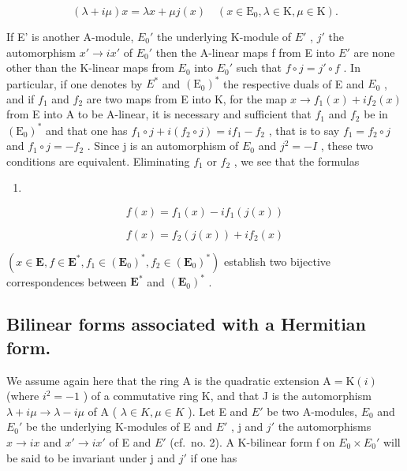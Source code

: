 \[
(\lambda + i \mu) x = \lambda x + \mu j (x) \quad (x \in \mathrm{E} _ {0}, \lambda \in \mathrm{K}, \mu \in \mathrm{K}).\tag{2}
\]

If E' is another A-module, \(E_{0}'\) the underlying K-module of \(E'\) , \(j'\) the automorphism \(x' \rightarrow ix'\) of \(E_{0}'\) then the A-linear maps f from E into \(E'\) are none other than the K-linear maps from \(E_{0}\) into \(E_{0}'\) such that \(f \circ j = j' \circ f\) . In particular, if one denotes by \(E^{*}\) and \((\mathrm{E}_{0})^{*}\) the respective duals of E and \(E_{0}\) , and if \(f_{1}\) and \(f_{2}\) are two maps from E into K, for the map \(x \to f_{1}(x) + if_{2}(x)\) from E into A to be A-linear, it is necessary and sufficient that \(f_{1}\) and \(f_{2}\) be in \((\mathrm{E}_{0})^{*}\) and that one has \(f_{1} \circ j + i(f_{2} \circ j) = if_{1} - f_{2}\) , that is to say \(f_{1} = f_{2} \circ j\) and \(f_{1} \circ j = -f_{2}\) . Since j is an automorphism of \(E_{0}\) and \(j^{2} = -I\) , these two conditions are equivalent. Eliminating \(f_{1}\) or \(f_{2}\) , we see that the formulas

\begin{enumerate}
\def\labelenumi{(\arabic{enumi})}
\setcounter{enumi}{2}
\tightlist
\item
\end{enumerate}

\[
f (x) = f _ {1} (x) - i f _ {1} (j (x))\tag{4}
\]

\[
f (x) = f _ {2} (j (x)) + i f _ {2} (x)
\]

\((x \in \mathbf{E}, f \in \mathbf{E}^{*}, f_{1} \in (\mathbf{E}_{0})^{*}, f_{2} \in (\mathbf{E}_{0})^{*})\) establish two bijective correspondences between \(\mathbf{E}^{*}\) and \((\mathbf{E}_{0})^{*}\) .

\subsection{Bilinear forms associated with a Hermitian form.}

We assume again here that the ring A is the quadratic extension \(\mathrm{A} = \mathrm{K}(i)\) (where \(i^{2} = -1\) ) of a commutative ring K, and that J is the automorphism \(\lambda + i\mu \to \lambda - i\mu\) of A ( \(\lambda \in K, \mu \in K\) ). Let E and \(E'\) be two A-modules, \(E_{0}\) and \(E_{0}'\) be the underlying K-modules of E and \(E'\) , j and \(j'\) the automorphisms \(x \to ix\) and \(x' \to ix'\) of E and \(E'\) (cf.~no. 2). A K-bilinear form f on \(E_{0} \times E_{0}'\) will be said to be invariant under j and \(j'\) if one has

